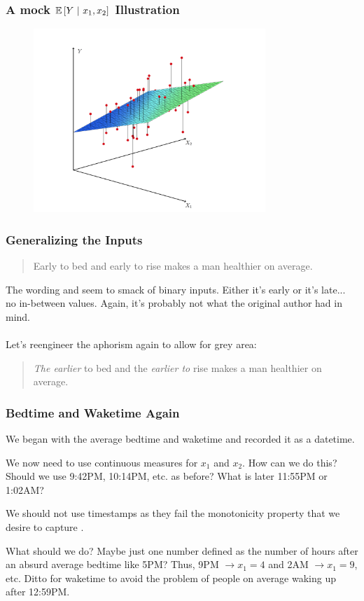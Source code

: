 \documentclass[handout]{beamer}
\begin{document}
\begin{frame}\frametitle{A mock $\mathbb{E}\left[Y~|~x_1, x_2\right]$ Illustration}

\begin{figure}
\centering
\includegraphics[width=3.45in]{cef.png}
\end{figure}
	
\end{frame}

\begin{frame}\frametitle{Generalizing the Inputs}

\begin{quotation}
Early to bed and early to rise makes a man healthier on average.
\end{quotation}

The wording  and  seem to smack of binary inputs. Either it's early or it's late... no in-between values. Again, it's probably not what the original author had in mind.\\~\\ %

Let's reengineer the aphorism again to allow for grey area:

\begin{quotation}
\emph{The earlier} to bed and the \emph{earlier to} rise makes a man healthier on average.
\end{quotation}

\end{frame}

\begin{frame}\frametitle{Bedtime and Waketime Again}

We began with the average bedtime and waketime and recorded it as a datetime.

We now need to use continuous measures for $x_1$ and $x_2$. How can we do this? Should we use 9:42PM, 10:14PM, etc. as before? What is later 11:55PM or 1:02AM?

We should not use timestamps as they fail the monotonicity property that we desire to capture .

What should we do? Maybe just one number defined as the number of hours after an absurd average bedtime like 5PM? Thus, 9PM $\rightarrow x_1 = 4$ and 2AM $\rightarrow x_1 = 9$, etc. Ditto for waketime to avoid the problem of people on average waking up after 12:59PM.
	
\end{frame}
\end{document}

